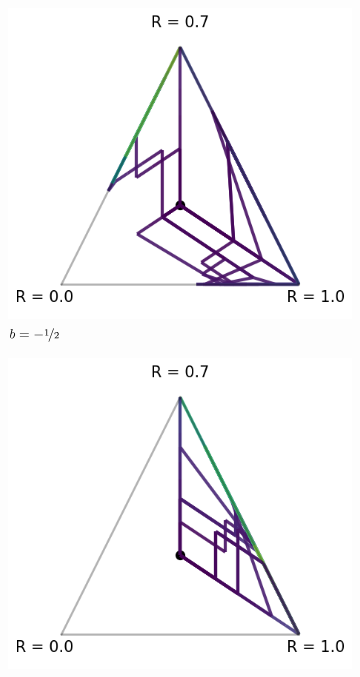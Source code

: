 \begin{figure}[!ht]
\centering
  \begin{subfigure}[b]{0.3\linewidth}
    \includegraphics[width=\textwidth]{articles/baselines/figs/appendix_figs_3arm_000/vanilla_fixed_-05.png}
    \caption{$b = - \nicefrac{1}{2}$}
  \end{subfigure}
    \begin{subfigure}[b]{0.3\linewidth}
    \includegraphics[width=\textwidth]{articles/baselines/figs/appendix_figs_3arm_000/vanilla_fixed_00.png}

\end{subfigure}
\end{figure}

